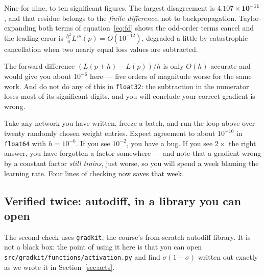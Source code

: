 \documentclass[11pt]{article}
\begin{document}
Nine for nine, to ten significant figures. The largest disagreement is
$\mathbf{4.107\times10^{-11}}$, and that residue belongs to the \emph{finite
difference}, not to backpropagation. Taylor-expanding both terms of
equation~\eqref{eq:fd} shows the odd-order terms cancel and the leading error
is $\tfrac{h^2}{6}L'''(p) = O(10^{-12})$, degraded a little by catastrophic
cancellation when two nearly equal loss values are subtracted.

\begin{caution}
The forward difference $(L(p+h)-L(p))/h$ is only $O(h)$ accurate and would
give you about $10^{-6}$ here --- five orders of magnitude worse for the same
work. And do not do any of this in \texttt{float32}: the subtraction in the
numerator loses most of its significant digits, and you will conclude your
correct gradient is wrong.
\end{caution}

\begin{tryit}
Take any network you have written, freeze a batch, and run the loop above over
twenty randomly chosen weight entries. Expect agreement to about $10^{-10}$ in
\texttt{float64} with $h = 10^{-6}$. If you see $10^{-2}$, you have a bug. If
you see $2\times$ the right answer, you have forgotten a factor somewhere ---
and note that a gradient wrong by a constant factor \emph{still trains}, just
worse, so you will spend a week blaming the learning rate. Four lines of
checking now saves that week.
\end{tryit}

\subsection{Verified twice: autodiff, in a library you can open}
\label{sec:gradkit}

The second check uses \texttt{gradkit}, the course's from-scratch autodiff
library. It is not a black box: the point of using it here is that you can
open \texttt{src/gradkit/functions/activation.py} and find $\sigma(1-\sigma)$
written out exactly as we wrote it in Section~\ref{sec:acts}.
\end{document}
